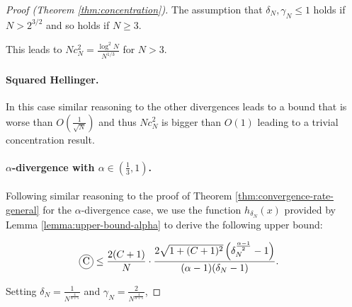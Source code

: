 \begin{proof}[Proof (Theorem \ref{thm:concentration})]
The assumption that $\delta_N, \gamma_N \leq 1$ holds if $N>2^{3/2}$ and so holds if $N\geq3$.

This leads to $Nc_N^2 = \frac{\log^2N}{N^{1/3}}$ for $N> 3$.


\paragraph{Squared Hellinger.}

In this case similar reasoning to the other divergences leads to a bound that is worse than $O\left(\frac{1}{\sqrt{N}}\right)$ and thus $Nc^2_N$ is bigger than $O(1)$ leading to a trivial concentration result.

\paragraph{$\alpha$-divergence with $\alpha\in(\frac{1}{3},1)$.}

Following similar reasoning to the proof of Theorem \ref{thm:convergence-rate-general} for the $\alpha$-divergence case, we use the function $h_{\delta_N}(x)$ provided by Lemma \ref{lemma:upper-bound-alpha} to derive the following upper bound:

\begin{align*}
    \encircle{C} &\leq \frac{2(C+1)}{N} \cdot \frac{2\sqrt{1+(C+1)^2}\left(\delta_N^\frac{\alpha-1}{2} - 1\right)}{(\alpha - 1) (\delta_N- 1)}.
\end{align*}


Setting $\delta_N = \frac{1}{N^\frac{4}{\alpha+5}}$ and $\gamma_N = \frac{2}{N^\frac{4}{\alpha+5}}$,


\end{proof}
